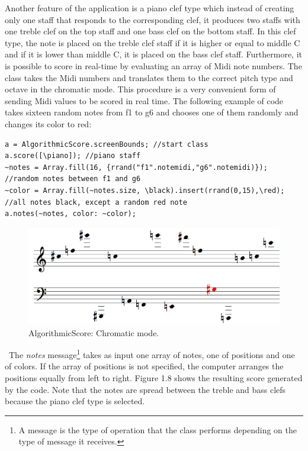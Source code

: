 Another feature of the application is a piano clef type which instead of creating only one staff that responds to the corresponding clef, it produces two staffs with one treble clef on the top staff and one bass clef on the bottom staff. In this clef type, the note is placed on the treble clef staff if it is higher or equal to middle C and if it is lower than middle C, it is placed on the bass clef staff. Furthermore, it is possible to score in real-time by evaluating an array of Midi note numbers. The class takes the Midi numbers and translates them to the correct pitch type and octave in the chromatic mode. This procedure is a very convenient form of sending Midi values to be scored in real time. The following example of code takes sixteen random notes from f1 to g6 and chooses one of them randomly and changes its color to red:
\begin{verbatim}
a = AlgorithmicScore.screenBounds; //start class
a.score([\piano]); //piano staff
~notes = Array.fill(16, {rrand("f1".notemidi,"g6".notemidi)}); 
//random notes between f1 and g6
~color = Array.fill(~notes.size, \black).insert(rrand(0,15),\red);
//all notes black, except a random red note
a.notes(~notes, color: ~color);
\end{verbatim}
\begin{figure}[htbp] %
   \centering
   \includegraphics[width=14cm]{Chapter6/algoscore2.tif} %
   \caption{AlgorithmicScore: Chromatic mode.}
   \label{fig:example}
\end{figure}\
The \emph{notes} message\footnote{A message is the type of operation that the class performs depending on the type of message it receives.} takes as input one array of notes, one of positions and one of colors. If the array of positions is not specified, the computer arranges the positions equally from left to right. Figure 1.8 shows the resulting score generated by the code. Note that the notes are spread between the treble and bass clefs because the piano clef type is selected. 

